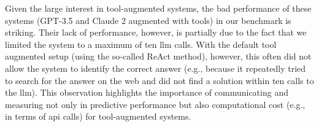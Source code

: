 \documentclass[11pt, oneside]{article}
\begin{document}
\begin{refsection}
Given the large interest in tool-augmented systems, the bad performance of these systems (GPT-3.5 and Claude 2 augmented with tools) in our benchmark is striking. 
Their lack of performance, however, is partially due to the fact that we limited the system to a maximum of ten \gls{llm} calls.
With the default tool augmented setup (using the so-called ReAct method\autocite{yao2023react}), however, this often did not allow the system to identify the correct answer (e.g., because it repeatedly tried to search for the answer on the web and did not find a solution within ten calls to the \gls{llm}).
This observation highlights the importance of communicating and measuring not only in predictive performance but also computational cost (e.g., in terms of \gls{api} calls) for tool-augmented systems.




\end{refsection}
\end{document}
